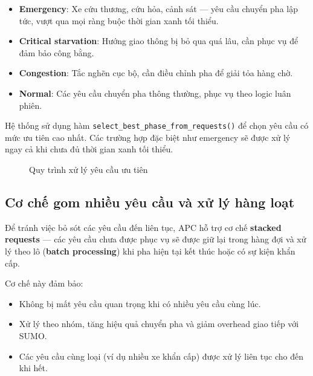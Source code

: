 \begin{itemize}
    \item \textbf{Emergency}: Xe cứu thương, cứu hỏa, cảnh sát — yêu cầu chuyển pha lập tức, vượt qua mọi ràng buộc thời gian xanh tối thiểu.
    \item \textbf{Critical starvation}: Hướng giao thông bị bỏ qua quá lâu, cần phục vụ để đảm bảo công bằng.
    \item \textbf{Congestion}: Tắc nghẽn cục bộ, cần điều chỉnh pha để giải tỏa hàng chờ.
    \item \textbf{Normal}: Các yêu cầu chuyển pha thông thường, phục vụ theo logic luân phiên.
\end{itemize}

Hệ thống sử dụng hàm \texttt{select\_best\_phase\_from\_requests()} để chọn yêu cầu có mức ưu tiên cao nhất. Các trường hợp đặc biệt như emergency sẽ được xử lý ngay cả khi chưa đủ thời gian xanh tối thiểu.

\begin{figure}[H]
    \centering
    \caption{Quy trình xử lý yêu cầu ưu tiên}
    \label{fig:priority_request_flow}
\end{figure}

\subsection{Cơ chế gom nhiều yêu cầu và xử lý hàng loạt}

Để tránh việc bỏ sót các yêu cầu đến liên tục, APC hỗ trợ cơ chế \textbf{stacked requests} — các yêu cầu chưa được phục vụ sẽ được giữ lại trong hàng đợi và xử lý theo lô (\textbf{batch processing}) khi pha hiện tại kết thúc hoặc có sự kiện khẩn cấp.

Cơ chế này đảm bảo:
\begin{itemize}
    \item Không bị mất yêu cầu quan trọng khi có nhiều yêu cầu cùng lúc.
    \item Xử lý theo nhóm, tăng hiệu quả chuyển pha và giảm overhead giao tiếp với SUMO.
    \item Các yêu cầu cùng loại (ví dụ nhiều xe khẩn cấp) được xử lý liên tục cho đến khi hết.
\end{itemize}

